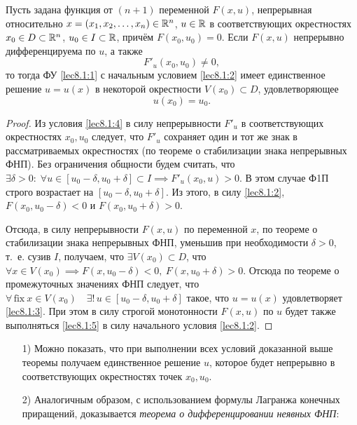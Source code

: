 \documentclass[../../main.tex]{subfiles}
\begin{document}
	 \begin{thm}
		Пусть задана функция от $(n+1)$ переменной $F(x, u)$, непрерывная 
		относительно $x = (x_1, x_2, \ldots,
	 	x_n) \in \mathbb{R}^n$, $u \in \mathbb{R}$ в соответствующих окрестностях $x_0 \in D 
	 	\subset \mathbb{R}^n$, $u_0 \in I \subset \mathbb{R}$, причём $F(x_0,u_0)=0$. Если $F(x,u)$ 
	 	непрерывно дифференцируема по $u$, а также 
		\begin{equation}
			F'_u(x_0, u_0) \ne 0, \label{lec8.1:4}
		\end{equation}
		то тогда ФУ \eqref{lec8.1:1} с начальным условием \eqref{lec8.1:2} имеет 
		единственное решение $u = u(x)$ в некоторой окрестности $V(x_0) 
		\subset D$, удовлетворяющее
	 	\begin{equation}
			u(x_0) = u_0. \label{lec8.1:5}
		\end{equation}
	 \end{thm}
	 \begin{proof}
		 Из условия \eqref{lec8.1:4} в силу непрерывности $F'_u$ в 
		 соответствующих окрестностях $x_0, u_0$ следует, что $F'_u$ сохраняет 
		 один и тот же знак в рассматриваемых окрестностях (по теореме о 
		 стабилизации знака непрерывных ФНП). Без ограничения общности 
		 будем считать, что $\exists \delta > 0: \; 
		 \forall u \in [u_0 - \delta, 
		 u_0 + \delta] \subset I \implies F'_u(x_0, u)>0$. В этом случае Ф1П
		 строго возрастает на $[u_0 - \delta, u_0 + \delta]$. Из этого, в силу 
		 \eqref{lec8.1:2}, $F(x_0, u_0 - \delta) < 0$ и
		 $ F(x_0, u_0 + \delta) > 0$.

		 Отсюда, в силу непрерывности
		 $F(x,u)$ по переменной $x$, по теореме о стабилизации  знака непрерывных ФНП, 
		 уменьшив при необходимости
		 $\delta > 0$, т.~е. сузив $I$, получаем, что $\exists V(x_0) 
		 \subset D$, что $\forall x \in V(x_0) \implies F(x, u_0 - 
		 \delta) < 0,\ F(x, u_0 + \delta) > 0$. Отсюда по теореме о промежуточных 
		 значениях ФНП следует, что $\forall\, \text{fix} 
		 \: x \in V(x_0) \quad \exists! \,
		 u \in [u_0 - \delta, u_0 + \delta]$ такое, что $u = u(x)$ удовлетворяет 
		 \eqref{lec8.1:3}. При этом в силу строгой монотонности $F(x, u)$ по $u$ 
		 будет также выполняться \eqref{lec8.1:5} в силу начального условия 
		 \eqref{lec8.1:2}. 
	 \end{proof}

	 \begin{rems}
	 \;
		 \begin{itemize}
		 	 \item[1)] Можно показать, что при выполнении всех условий 
		 	 доказанной выше теоремы получаем единственное решение $u$, 
		 	 которое будет непрерывно в соответствующих окрестностях точек 
		 	 $x_0, u_0$.

			 \item[2)] Аналогичным образом, с использованием формулы Лагранжа 
			 конечных приращений, доказывается \emph{теорема о 
			 дифференцировании неявных ФНП}:
		\end{itemize}
	\end{rems}
\end{document}
